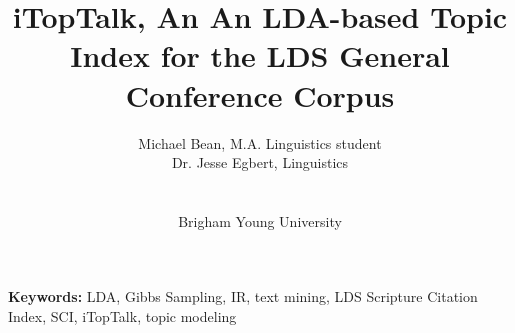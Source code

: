 \title{iTopTalk, An An LDA-based Topic Index for the LDS General Conference Corpus}

\author{Michael Bean, M.A. Linguistics student\\
Dr. Jesse Egbert, Linguistics\\
\\
\\
Brigham Young University\\
}

\maketitle

{\bf Keywords:} LDA, Gibbs Sampling, IR, text mining, LDS Scripture Citation Index, SCI, iTopTalk, topic modeling
